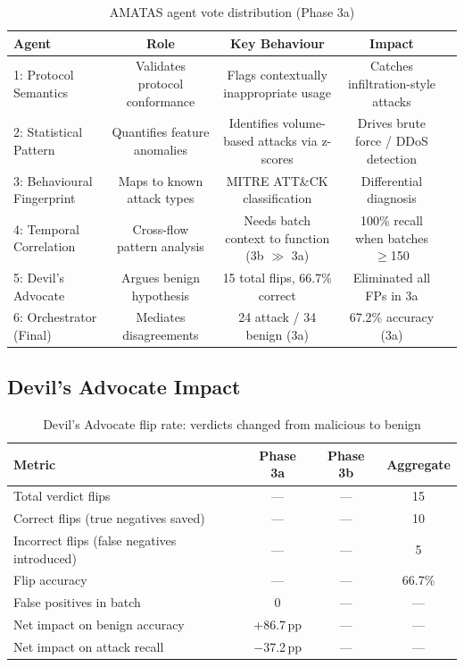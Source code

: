 \documentclass[12pt, a4paper, oneside]{report}
\begin{document}
\begin{table}[H]
\centering
\caption{AMATAS agent vote distribution (Phase 3a)}
\label{tab:agent-votes}
\begin{tabular}{@{}lcccc@{}}
\toprule
\textbf{Agent} & \textbf{Role} & \textbf{Key Behaviour}
  & \textbf{Impact} \\
\midrule
1: Protocol Semantics     & Validates protocol conformance & Flags contextually
  inappropriate usage & Catches infiltration-style attacks \\
2: Statistical Pattern    & Quantifies feature anomalies & Identifies volume-based
  attacks via z-scores & Drives brute force / DDoS detection \\
3: Behavioural Fingerprint & Maps to known attack types & MITRE ATT\&CK
  classification & Differential diagnosis \\
4: Temporal Correlation   & Cross-flow pattern analysis & Needs batch context to
  function (3b $\gg$ 3a) & 100\% recall when batches $\geq$150 \\
5: Devil's Advocate       & Argues benign hypothesis & 15 total flips, 66.7\%
  correct & Eliminated all FPs in 3a \\
\midrule
6: Orchestrator (Final)   & Mediates disagreements & 24 attack / 34 benign (3a)
  & 67.2\% accuracy (3a) \\
\bottomrule
\end{tabular}
\end{table}


\subsection{Devil's Advocate Impact}

\begin{table}[H]
\centering
\caption{Devil's Advocate flip rate: verdicts changed from malicious to benign}
\label{tab:devils-advocate}
\begin{tabular}{@{}lccc@{}}
\toprule
\textbf{Metric} & \textbf{Phase 3a} & \textbf{Phase 3b} & \textbf{Aggregate} \\
\midrule
Total verdict flips                          & ---  & ---  & 15 \\
Correct flips (true negatives saved)         & ---  & ---  & 10 \\
Incorrect flips (false negatives introduced) & ---  & ---  &  5 \\
Flip accuracy                                & ---  & ---  & 66.7\% \\
False positives in batch                     &  0   & ---  & --- \\
Net impact on benign accuracy                & +86.7\,pp & --- & --- \\
Net impact on attack recall                  & $-$37.2\,pp & --- & --- \\
\bottomrule
\end{tabular}
\end{table}
\end{document}
